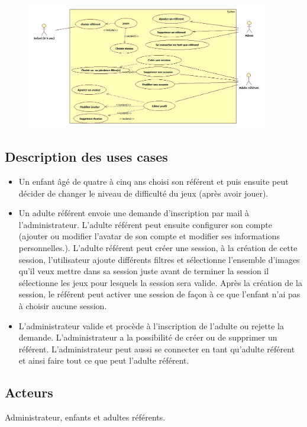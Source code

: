 \documentclass[12pt,a4paper]{report}
\begin{document}
\begin{figure}[!h]
\centering
\includegraphics[width=400px]{UseCaseDiagram2.jpg}
\end{figure}

\subsection{Description des uses cases}

\begin{itemize}
\item Un enfant âgé de quatre à cinq ans choisi son référent et puis ensuite peut décider de changer le niveau de difficulté du jeux (après avoir jouer).
\item Un adulte référent envoie une demande d'inscription par mail à l'administrateur. L'adulte référent peut ensuite configurer son compte (ajouter ou modifier l'avatar de son compte et modifier ses informations personnelles.). L'adulte référent peut créer une session, à la création de cette session, l'utilisateur ajoute différents filtres et sélectionne l'ensemble d'images qu'il veux mettre dans sa session juste avant de terminer la session il sélectionne les jeux pour lesquels la session sera valide. Après la création de la session, le référent peut activer une session de façon à ce que l'enfant n'ai pas à choisir aucune session.
\item L'administrateur valide et procède à l'inscription de l'adulte ou rejette la demande. L'administrateur a la possibilité de créer ou de supprimer un référent. L'administrateur peut aussi se connecter en tant qu'adulte référent et ainsi faire tout ce que peut l'adulte référent.
\end{itemize}

\subsection{Acteurs}
Administrateur, enfants et adultes référents.
\end{document}
